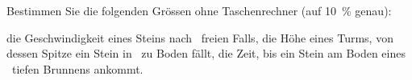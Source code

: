 Bestimmen Sie die folgenden Grössen ohne Taschenrechner (auf \SI{10}{\percent} genau):

\begin{abcliste}
\abc die Geschwindigkeit eines Steins nach \taO\ freien Falls,
\abc die Höhe eines Turms, von dessen Spitze ein Stein in \tbO\ zu Boden fällt,
\abc die Zeit, bis ein Stein am Boden eines \hcO\ tiefen Brunnens ankommt.
\end{abcliste}
